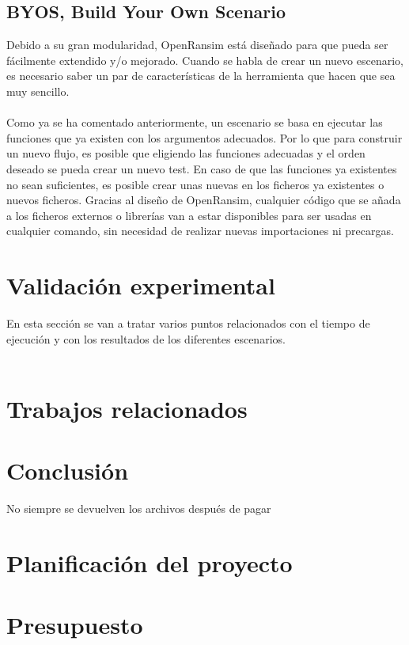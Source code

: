\documentclass[a4paper,12pt]{article}
\begin{document}
\subsection{BYOS, Build Your Own Scenario}
Debido a su gran modularidad, OpenRansim está diseñado para que pueda ser fácilmente extendido y/o mejorado. Cuando se habla de crear un nuevo escenario, es necesario saber un par de características de la herramienta que hacen que sea muy sencillo.\\\\
Como ya se ha comentado anteriormente, un escenario se basa en ejecutar las funciones que ya existen con los argumentos adecuados. Por lo que para construir un nuevo flujo, es posible que eligiendo las funciones adecuadas y el orden deseado se pueda crear un nuevo test. En caso de que las funciones ya existentes no sean suficientes, es posible crear unas nuevas en los ficheros ya existentes o nuevos ficheros. Gracias al diseño de OpenRansim, cualquier código que se añada a los ficheros externos o librerías van a estar disponibles para ser usadas en cualquier comando, sin necesidad de realizar nuevas importaciones ni precargas.
\newpage
\section{Validación experimental}
En esta sección se van a tratar varios puntos relacionados con el tiempo de ejecución y con los resultados de los diferentes escenarios.\\\\
\newpage
\section{Trabajos relacionados}
\newpage
\section{Conclusión}
No siempre se devuelven los archivos después de pagar
\appendix
\section{Planificación del proyecto}
\section{Presupuesto}
\end{document}

